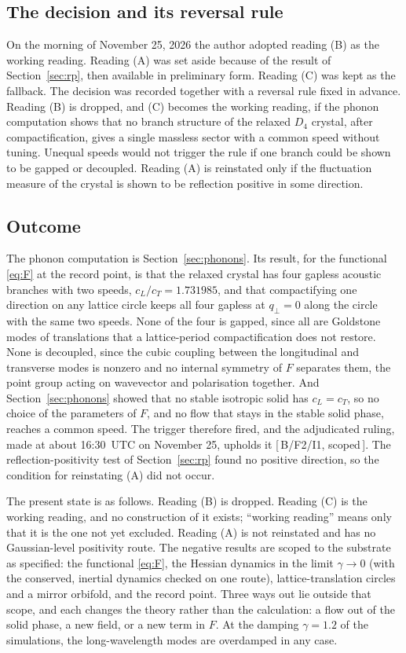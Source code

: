 \documentclass[a4paper,11pt]{article}
\numberwithin{equation}{section}
\theoremstyle{jsplain}
\theoremstyle{jsrem}
\newcommand{\grade}[1]{[\,#1\,]}
\begin{document}
\subsection{The decision and its reversal rule}

On the morning of November 25, 2026 the author adopted reading (B) as the working reading. Reading (A) was set aside because of the result of Section~\ref{sec:rp}, then available in preliminary form. Reading (C) was kept as the fallback. The decision was recorded together with a reversal rule fixed in advance. Reading (B) is dropped, and (C) becomes the working reading, if the phonon computation shows that no branch structure of the relaxed $D_4$ crystal, after compactification, gives a single massless sector with a common speed without tuning. Unequal speeds would not trigger the rule if one branch could be shown to be gapped or decoupled. Reading (A) is reinstated only if the fluctuation measure of the crystal is shown to be reflection positive in some direction.

\subsection{Outcome}

The phonon computation is Section~\ref{sec:phonons}. Its result, for the functional \eqref{eq:F} at the record point, is that the relaxed crystal has four gapless acoustic branches with two speeds, $c_L/c_T=1.731985$, and that compactifying one direction on any lattice circle keeps all four gapless at $q_\perp=0$ along the circle with the same two speeds. None of the four is gapped, since all are Goldstone modes of translations that a lattice-period compactification does not restore. None is decoupled, since the cubic coupling between the longitudinal and transverse modes is nonzero and no internal symmetry of $F$ separates them, the point group acting on wavevector and polarisation together. And Section~\ref{sec:phonons} showed that no stable isotropic solid has $c_L=c_T$, so no choice of the parameters of $F$, and no flow that stays in the stable solid phase, reaches a common speed. The trigger therefore fired, and the adjudicated ruling, made at about 16:30~UTC on November 25, upholds it \grade{B/F2/I1, scoped}. The reflection-positivity test of Section~\ref{sec:rp} found no positive direction, so the condition for reinstating (A) did not occur.

The present state is as follows. Reading (B) is dropped. Reading (C) is the working reading, and no construction of it exists; ``working reading'' means only that it is the one not yet excluded. Reading (A) is not reinstated and has no Gaussian-level positivity route. The negative results are scoped to the substrate as specified: the functional \eqref{eq:F}, the Hessian dynamics in the limit $\gamma\to0$ (with the conserved, inertial dynamics checked on one route), lattice-translation circles and a mirror orbifold, and the record point. Three ways out lie outside that scope, and each changes the theory rather than the calculation: a flow out of the solid phase, a new field, or a new term in $F$. At the damping $\gamma=1.2$ of the simulations, the long-wavelength modes are overdamped in any case.
\end{document}
